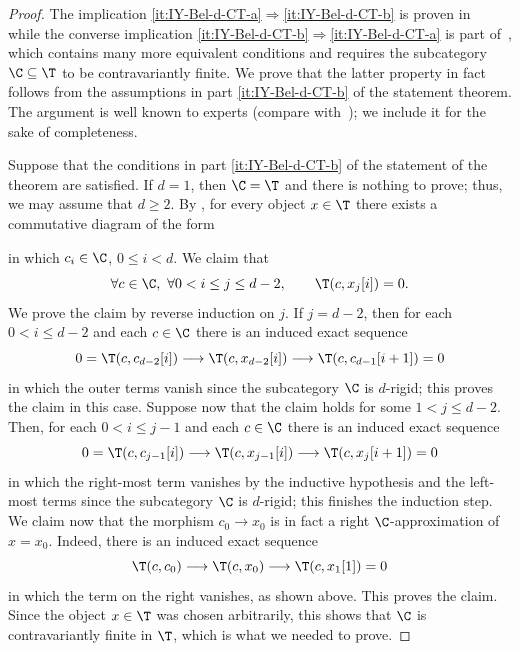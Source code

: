 \documentclass[a4paper]{amsart}
\begin{document}
\begin{proof}
  The implication \eqref{it:IY-Bel-d-CT-a}$\Rightarrow$\eqref{it:IY-Bel-d-CT-b}
  is proven in~\cite[Thm.~3.1]{IY08} while the converse implication
  \eqref{it:IY-Bel-d-CT-b}$\Rightarrow$\eqref{it:IY-Bel-d-CT-a} is part
  of~\cite[Thm.~5.3]{Bel15}, which contains many more equivalent conditions and
  requires the subcategory $\C\subseteq\T$ to be contravariantly finite. We
  prove that the latter property in fact follows from the assumptions in part
  \eqref{it:IY-Bel-d-CT-b} of the statement theorem. The argument is well known
  to experts (compare with~\cite[Lemma~4.3]{GKO13}); we include it for the sake
  of completeness.

  Suppose that the conditions in part \eqref{it:IY-Bel-d-CT-b} of the statement
  of the theorem are satisfied. If $d=1$, then $\C=\T$ and there is nothing to
  prove; thus, we may assume that $d\geq2$. By , for every object
  $x\in\T$ there exists a commutative diagram of the form
  \begin{center}
  \end{center}
  in which $c_i\in\C$, $0\leq i<d$. We claim that
  \[
    \forall c\in\C,\ \forall 0<i\leq j\leq d-2,\qquad \T(c,x_j[i])=0.
  \]
  We prove the claim by reverse induction on $j$. If $j=d-2$, then for each
  $0<i\leq d-2$ and each $c\in\C$ there is an induced exact sequence
  \[
    0=\T(c,c_{d-2}[i])\longrightarrow\T(c,x_{d-2}[i])\longrightarrow
    \T(c,c_{d-1}[i+1])=0
  \]
  in which the outer terms vanish since the subcategory $\C$ is $d$-rigid; this
  proves the claim in this case. Suppose now that the claim holds for some
  $1<j\leq d-2$. Then, for each $0<i\leq j-1$ and each $c\in\C$ there is an
  induced exact sequence
  \[
    0=\T(c,c_{j-1}[i])\longrightarrow\T(c,x_{j-1}[i])\longrightarrow\T(c,x_j[i+1])=0
  \]
  in which the right-most term vanishes by the inductive hypothesis and the
  left-most terms since the subcategory $\C$ is $d$-rigid; this finishes the
  induction step. We claim now that the morphism $c_0\to x_0$ is in fact a right
  $\C$-approximation of $x=x_0$. Indeed, there is an induced exact sequence
  \[
    \T(c,c_0)\longrightarrow\T(c,x_0)\longrightarrow\T(c,x_1[1])=0
  \]
  in which the term on the right vanishes, as shown above. This proves the
  claim. Since the object $x\in\T$ was chosen arbitrarily, this shows that $\C$
  is contravariantly finite in $\T$, which is what we needed to prove.
\end{proof}
\end{document}
